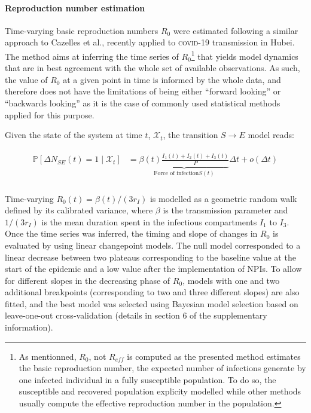  \paragraph{Reproduction number estimation} Time-varying basic reproduction numbers $R_0$ were estimated following a similar approach to Cazelles et al.\cite{Cazelles:AccountingNonstationarityEpidemiology:2018}, recently applied to \textsc{covid}-19 transmission in Hubei\cite{Kucharski:EarlyDynamicsTransmission:2020}. The method aims at inferring the time series of $R_0$\footnote{As mentionned, $R_0$, not $R_{eff}$ is computed as the presented method estimates the basic reproduction number, \ie the expected number of infections generate by one infected individual in a fully susceptible population. To do so, the susceptible and recovered population explicity modelled  while other methods usually compute the effective reproduction number in the population.} that yields model dynamics that are in best agreement with the whole set of available observations. As such, the value of $R_0$ at a given point in time is informed by the whole data, and therefore does not have the limitations of being either “forward looking” or “backwards looking” as it is the case of commonly used statistical methods applied for this purpose\cite{Wallinga:DifferentEpidemicCurves:2004,Cori:NewFrameworkSoftware:2013,Lipsitch:CommentPanLiu:2020}. 
 
Given the state of the system at time \(t\), \(\mathcal{X}_t\), the transition $S \longrightarrow E$ model reads:

\begin{gather}
\begin{aligned}
    \mathbb{P}\left[ \Delta N_{SE}(t) = 1 \mid\mathcal{X}_t\right] &=  \underbrace{\beta(t)  \frac{I_1(t) + I_2(t) + I_3(t)}{P}}_{\text{Force of infection} S(t)} \Delta t + o(\Delta t)\\
    \end{aligned}
\end{gather}

Time-varying $R_0(t) = \beta(t)/(3r_I)$ is modelled as a geometric random walk defined by its calibrated variance, where $\beta$ is the transmission parameter and $1/(3r_I)$ is the mean duration spent in the infectious compartments $I_1$ to $I_3$. Once the time series was inferred, the timing and slope of changes in $R_0$ is evaluated by using linear changepoint models\cite{Lindelov:McpPackageRegression:2020}. The null model corresponded to a linear decrease between two plateaus corresponding to the baseline value at the start of the epidemic and a low value after the implementation of NPIs. To allow for different slopes in the decreasing phase of $R_0$, models with one and two additional breakpoints (corresponding to two and three different slopes) are also fitted, and the best model was selected using Bayesian model selection based on leave-one-out cross-validation (details in section 6 of the supplementary information). 

